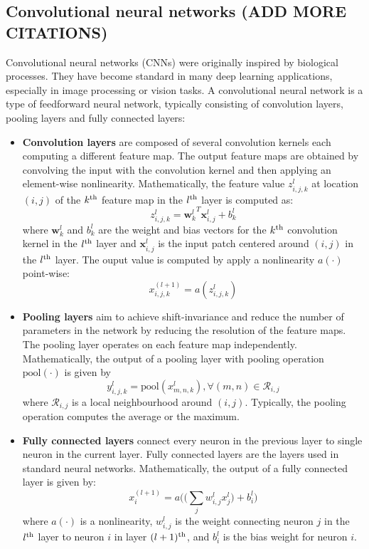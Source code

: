 \documentclass{article}
\begin{document}
\subsection{Convolutional neural networks \cite{DBLP:journals/corr/GuWKMSSLWW15} (ADD MORE CITATIONS)}
Convolutional neural networks (CNNs) were originally inspired by biological processes. They have become standard in many deep learning applications, especially in image processing or vision tasks. A convolutional neural network is a type of feedforward neural network, typically consisting of convolution layers, pooling layers and fully connected layers:
\begin{itemize}
	\item \textbf{Convolution layers} are composed of  several 	convolution kernels each computing a different feature map. The output feature maps are obtained by convolving the input with the convolution kernel and then applying an element-wise nonlinearity. Mathematically, the feature value $z_{i,j,k}^l$ at location $(i,j)$ of the $k\textsuperscript{th}$ feature map in the $l\textsuperscript{th}$ layer is computed as:
	\[z_{i,j,k}^l = {\mathbf{w}_k^l}^T \mathbf{x}_{i,j}^l + b_k^l\]
	where  $\mathbf{w}_k^l$ and $b_k^l$ are the weight and bias vectors for the $k\textsuperscript{th}$ convolution kernel in the $l\textsuperscript{th}$ layer and $\mathbf{x}_{i,j}^l$ is the input patch centered around $(i,j)$ in the $l\textsuperscript{th}$ layer. The ouput value is computed by apply a nonlinearity $a(\cdot)$ point-wise:
	\[x_{i,j,k}^{(l+1)} = a(z_{i,j,k}^l) \]

	\item \textbf{Pooling layers} aim to achieve shift-invariance and reduce the number of parameters in the network by reducing the resolution of the feature maps. The pooling layer operates on each feature map independently. Mathematically, the output of a pooling layer with pooling operation $\textrm{pool}(\cdot)$ is given by 
	\[ y_{i,j,k}^l = \textrm{pool}(x^l_{m,n,k}), \forall (m,n) \in \mathcal{R}_{i,j}\]
	where $\mathcal{R}_{i,j}$ is a local neighbourhood around $(i,j)$. Typically, the pooling operation computes the average or the maximum.
	
	\item \textbf{Fully connected layers} connect every neuron in the previous layer to single neuron in the current layer. Fully connected layers are the layers used in standard neural networks. Mathematically, the output of a fully connected layer is given by:
	\[ x^{(l+1)}_i = a\Big(\big( \sum_j w_{i,j}^l x^l_j \big) + b^l_i\big)\]
	where $a(\cdot)$ is a nonlinearity, $w_{i,j}^l$ is the weight connecting neuron $j$ in the $l\textsuperscript{th}$ layer to neuron $i$ in layer $(l+1)\textsuperscript{th}$, and $b_i^l$ is the bias weight for neuron $i$.
\end{itemize}
\end{document}
